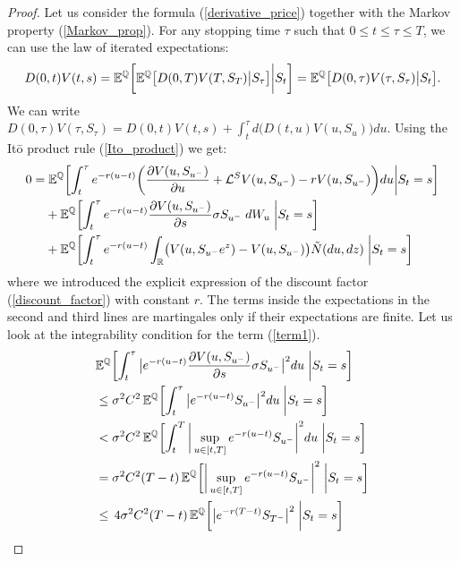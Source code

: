 \begin{proof}
 Let us consider the formula 
 (\ref{derivative_price}) together with the Markov property (\ref{Markov_prop}). 
 For any stopping time $\tau$ such that $0 \leq t \leq \tau \leq T$, we can use the law of iterated expectations:
 \begin{equation*}
   D(0,t) V(t,s) = \mathbb{E}^{\mathbb{Q}}  \biggl[ \mathbb{E}^{\mathbb{Q}} \bigl[ D(0,T) V(T,S_T) \big| S_{\tau} \bigr] \bigg| S_t \biggr] = \mathbb{E}^{\mathbb{Q}} \bigl[ D(0,\tau) V(\tau,S_{\tau}) \big| S_t \bigr]. 
 \end{equation*}
 We can write $D(0,\tau) V(\tau,S_{\tau}) = D(0,t) V(t,s) + \int_t^{\tau} d\bigl(D(t,u) V(u,S_u)\bigr) du$. 
 Using the It\=o product rule (\ref{Ito_product}) we get:
 \begin{align}\label{proof_Cont_V}
  0 =& \; \mathbb{E}^{\mathbb{Q}} \biggl[ \int_t^{\tau} e^{-r(u-t)} \biggl( \frac{\partial V(u,S_{u^-})}{\partial u} + \mathcal{L}^{S} V(u,S_{u^-}) -r V(u,S_{u^-}) \biggr) du \bigg| S_t=s \biggr] \\ \label{term1}
     & + \mathbb{E}^{\mathbb{Q}} \biggl[ \int_t^{\tau} e^{-r(u-t)} \frac{\partial V(u,S_{u^-})}{\partial s} \sigma S_{u^-} \; dW_u \; \bigg| S_t=s \biggr] \\ \label{term2}
     & + \mathbb{E}^{\mathbb{Q}} \biggl[ \int_t^{\tau} e^{-r(u-t)} \int_{\mathbb{R}} \bigl( V(u,S_{u^-}e^z) - V(u,S_{u^-}) \bigr) \tilde N(du,dz) \; \bigg| S_t=s \biggr]
 \end{align}
 where we introduced the explicit expression of the discount factor (\ref{discount_factor}) with constant $r$.
 The terms inside the expectations in the second and third lines are martingales only if their expectations are finite.
 Let us look at the integrability condition for the term (\ref{term1}). 
 \begin{align*}
& \E^{\Q} \biggl[ \int_t^{\tau} \big| e^{-r(u-t)} \frac{\partial V(u,S_{u^-})}{\partial s} \sigma S_{u^-} \big|^2 du \; \bigg| S_t=s \biggr] \\
& \leq \sigma^2 C^2\, \E^{\Q} \biggl[ \int_t^{\tau} \big| e^{-r(u-t)} S_{u^-} \big|^2 du \; \bigg| S_t=s \biggr] \\
& < \sigma^2 C^2\, \E^{\Q} \biggl[ \int_t^{T} \bigg| \sup_{u\in [t,T]} e^{-r(u-t)} S_{u^-} \bigg|^2 du \; \bigg| S_t=s \biggr] \\
& = \sigma^2 C^2 (T-t)\, \E^{\Q} \biggl[ \bigg| \sup_{u\in [t,T]} e^{-r(u-t)} S_{u^-} \bigg|^2  \; \bigg| S_t=s \biggr] \\
& \leq \, 4 \sigma^2 C^2 (T-t)\, \E^{\Q} \biggl[ \big| e^{-r(T-t)} S_{T^-} \big|^2  \; \bigg| S_t=s \biggr] \\

\end{align*}
\end{proof}
